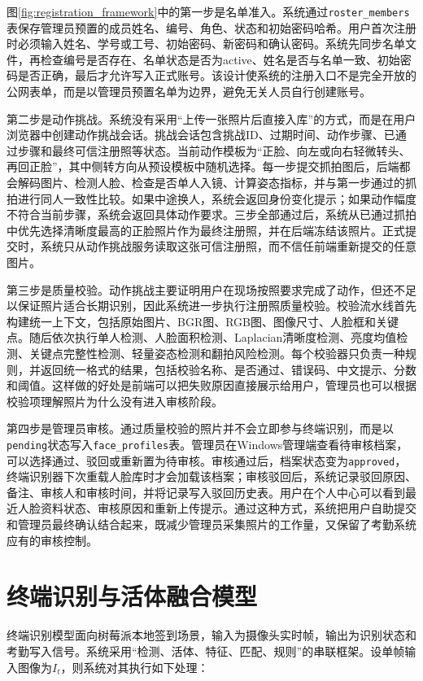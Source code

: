 图\ref{fig:registration_framework}中的第一步是名单准入。系统通过\texttt{roster\_members}表保存管理员预置的成员姓名、编号、角色、状态和初始密码哈希。用户首次注册时必须输入姓名、学号或工号、初始密码、新密码和确认密码。系统先同步名单文件，再检查编号是否存在、名单状态是否为active、姓名是否与名单一致、初始密码是否正确，最后才允许写入正式账号。该设计使系统的注册入口不是完全开放的公网表单，而是以管理员预置名单为边界，避免无关人员自行创建账号。

第二步是动作挑战。系统没有采用“上传一张照片后直接入库”的方式，而是在用户浏览器中创建动作挑战会话。挑战会话包含挑战ID、过期时间、动作步骤、已通过步骤和最终可信注册照等状态。当前动作模板为“正脸、向左或向右轻微转头、再回正脸”，其中侧转方向从预设模板中随机选择。每一步提交抓拍图后，后端都会解码图片、检测人脸、检查是否单人入镜、计算姿态指标，并与第一步通过的抓拍进行同人一致性比较。如果中途换人，系统会返回身份变化提示；如果动作幅度不符合当前步骤，系统会返回具体动作要求。三步全部通过后，系统从已通过抓拍中优先选择清晰度最高的正脸照片作为最终注册照，并在后端冻结该照片。正式提交时，系统只从动作挑战服务读取这张可信注册照，而不信任前端重新提交的任意图片。

第三步是质量校验。动作挑战主要证明用户在现场按照要求完成了动作，但还不足以保证照片适合长期识别，因此系统进一步执行注册照质量校验。校验流水线首先构建统一上下文，包括原始图片、BGR图、RGB图、图像尺寸、人脸框和关键点。随后依次执行单人检测、人脸面积检测、Laplacian清晰度检测、亮度均值检测、关键点完整性检测、轻量姿态检测和翻拍风险检测。每个校验器只负责一种规则，并返回统一格式的结果，包括校验名称、是否通过、错误码、中文提示、分数和阈值。这样做的好处是前端可以把失败原因直接展示给用户，管理员也可以根据校验项理解照片为什么没有进入审核阶段。

第四步是管理员审核。通过质量校验的照片并不会立即参与终端识别，而是以\texttt{pending}状态写入\texttt{face\_profiles}表。管理员在Windows管理端查看待审核档案，可以选择通过、驳回或重新置为待审核。审核通过后，档案状态变为\texttt{approved}，终端识别器下次重载人脸库时才会加载该档案；审核驳回后，系统记录驳回原因、备注、审核人和审核时间，并将记录写入驳回历史表。用户在个人中心可以看到最近人脸资料状态、审核原因和重新上传提示。通过这种方式，系统把用户自助提交和管理员最终确认结合起来，既减少管理员采集照片的工作量，又保留了考勤系统应有的审核控制。

\section{终端识别与活体融合模型}

终端识别模型面向树莓派本地签到场景，输入为摄像头实时帧，输出为识别状态和考勤写入信号。系统采用“检测、活体、特征、匹配、规则”的串联框架。设单帧输入图像为$I_t$，则系统对其执行如下处理：

